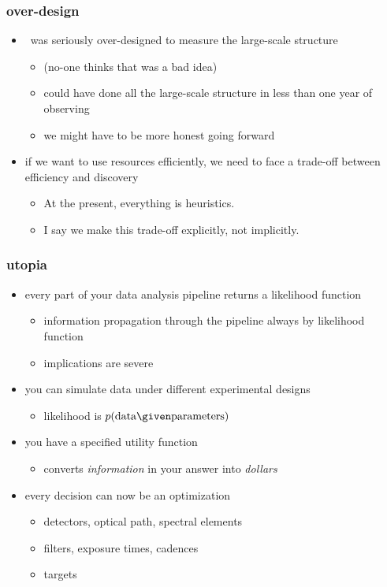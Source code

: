 \documentclass[pdftex]{beamer}
\newcommand{\data}{\mbox{data}}
\newcommand{\pars}{\mbox{parameters}}
\begin{document}
\begin{frame}
  \frametitle{over-design}
  \begin{itemize}
  \item \sdss\ was seriously over-designed to measure the large-scale structure
    \begin{itemize}
    \item (no-one thinks that was a bad idea)
    \item could have done all the large-scale structure in less than one year of observing
    \item we might have to be more honest going forward
    \end{itemize}
  \item if we want to use resources efficiently, we need to face a trade-off between efficiency and discovery
    \begin{itemize}
    \item At the present, everything is heuristics.
    \item I say we make this trade-off explicitly, not implicitly.
    \end{itemize}
  \end{itemize}
\end{frame}

\begin{frame}
  \frametitle{utopia}
  \begin{itemize}
  \item every part of your data analysis pipeline returns a likelihood function
    \begin{itemize}
    \item information propagation through the pipeline always by likelihood function
    \item implications are severe
    \end{itemize}
  \item you can simulate data under different experimental designs
    \begin{itemize}
    \item likelihood is $p(\data\given\pars)$
    \end{itemize}
  \item you have a specified utility function
    \begin{itemize}
    \item converts \emph{information} in your answer into \emph{dollars}
    \end{itemize}
  \item every decision can now be an optimization
    \begin{itemize}
    \item detectors, optical path, spectral elements
    \item filters, exposure times, cadences
    \item targets
    \end{itemize}
  \end{itemize}
\end{frame}
\end{document}

